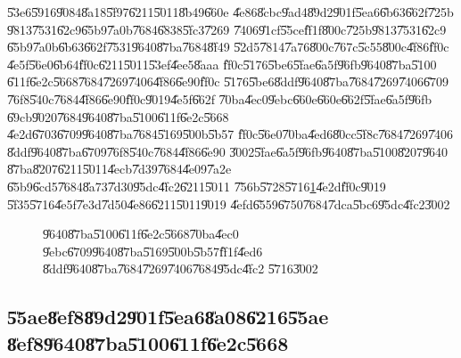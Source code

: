 \bigskip

\U{53e6}\U{5916}\U{9084}\U{8a18}\U{5f97}\U{6211}\U{5011}\U{8b49}\U{660e}%
\U{4e86}\U{8cbc}\U{9ad4}\U{89d2}\U{901f}\U{5ea6}\U{6b63}\U{662f}\U{725b}%
\U{9813}\U{7531}\U{62c9}\U{65b9}\U{7a0b}\U{7684}\U{6838}\U{5fc3}\U{7269}%
\U{7406}\U{91cf}\U{55ce}\U{ff1f}\U{800c}\U{725b}\U{9813}\U{7531}\U{62c9}%
\U{65b9}\U{7a0b}\U{6b63}\U{662f}\U{7531}\U{9640}\U{87ba}\U{7684}\U{8f49}%
\U{52d5}\U{7814}\U{7a76}\U{800c}\U{767c}\U{5c55}\U{800c}\U{4f86}\U{ff0c}%
\U{4e5f}\U{56e0}\U{6b64}\U{ff0c}\U{6211}\U{5011}\U{53ef}\U{4ee5}\U{8aaa}%
\U{ff0c}\U{5176}\U{5be6}\U{5fae}\U{6a5f}\U{96fb}\U{9640}\U{87ba}\U{5100}%
\U{611f}\U{6e2c}\U{5668}\U{7684}\U{7269}\U{7406}\U{4f86}\U{6e90}\U{ff0c}%
\U{5176}\U{5be6}\U{8ddf}\U{9640}\U{87ba}\U{7684}\U{7269}\U{7406}\U{6709}%
\U{76f8}\U{540c}\U{7684}\U{4f86}\U{6e90}\U{ff0c}\U{9019}\U{4e5f}\U{662f}%
\U{70ba}\U{4ec0}\U{9ebc}\U{660e}\U{660e}\U{662f}\U{5fae}\U{6a5f}\U{96fb}%
\U{69cb}\U{9020}\U{7684}\U{9640}\U{87ba}\U{5100}\U{611f}\U{6e2c}\U{5668}%
\U{4e2d}\U{6703}\U{6709}\U{9640}\U{87ba}\U{7684}\U{5169}\U{500b}\U{5b57}%
\U{ff0c}\U{56e0}\U{70ba}\U{4ed6}\U{80cc}\U{5f8c}\U{7684}\U{7269}\U{7406}%
\U{8ddf}\U{9640}\U{87ba}\U{6709}\U{76f8}\U{540c}\U{7684}\U{4f86}\U{6e90}%
\U{3002}\U{5fae}\U{6a5f}\U{96fb}\U{9640}\U{87ba}\U{5100}\U{8207}\U{9640}%
\U{87ba}\U{8207}\U{6211}\U{5011}\U{4ecb}\U{7d39}\U{7684}\U{4e09}\U{7a2e}%
\U{65b9}\U{6cd5}\U{7684}\U{8a73}\U{7d30}\U{95dc}\U{4fc2}\U{6211}\U{5011}%
\U{756b}\U{5728}\U{5716}\ref{gyro_relation_graph}\U{4e2d}\U{ff0c}\U{9019}%
\U{5f35}\U{5716}\U{4e5f}\U{7e3d}\U{7d50}\U{4e86}\U{6211}\U{5011}\U{9019}%
\U{4efd}\U{6559}\U{6750}\U{7684}\U{7dca}\U{5bc6}\U{95dc}\U{4fc2}\U{3002}

\begin{figure}[th]
\caption{\U{9640}\U{87ba}\U{5100}\U{611f}\U{6e2c}\U{5668}\U{70ba}\U{4ec0}%
\U{9ebc}\U{6709}\U{9640}\U{87ba}\U{5169}\U{500b}\U{5b57}\U{ff1f}\U{4ed6}%
\U{8ddf}\U{9640}\U{87ba}\U{7684}\U{7269}\U{7406}\U{7684}\U{95dc}\U{4fc2}%
\U{5716}\U{3002}}
\label{gyro_relation_graph}
\begin{center}

\end{center}
\end{figure}

\clearpage%

\subsection{\U{55ae}\U{8ef8}\U{89d2}\U{901f}\U{5ea6}\U{8a08}\U{6216}\U{55ae}%
\U{8ef8}\U{9640}\U{87ba}\U{5100}\U{611f}\U{6e2c}\U{5668}}

